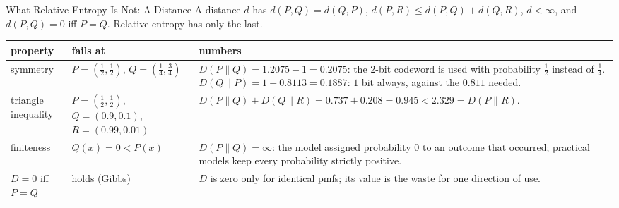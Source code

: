 \begin{frame}{What Relative Entropy Is Not: A Distance}
  \small
  A distance $d$ has $d(P,Q)=d(Q,P)$, $d(P,R)\le d(P,Q)+d(Q,R)$, $d<\infty$, and $d(P,Q)=0$ iff $P=Q$. Relative entropy has only the last.
  \begin{center}
    \renewcommand{\arraystretch}{1.2}
    \begin{tabular}{@{}>{\raggedright\arraybackslash}p{2.3cm}>{\raggedright\arraybackslash}p{4.2cm}>{\raggedright\arraybackslash}p{6.6cm}@{}}
      \toprule
      property & fails at & numbers \\
      \midrule
      symmetry & $P=(\tfrac12,\tfrac12)$, $Q=(\tfrac14,\tfrac34)$ &
        $D(P\|Q)=1.2075-1=0.2075$: the $2$-bit codeword is used with probability $\tfrac12$ instead of $\tfrac14$. \newline
        $D(Q\|P)=1-0.8113=0.1887$: $1$ bit always, against the $0.811$ needed. \\
      triangle inequality & $P=(\tfrac12,\tfrac12)$, $Q=(0.9,0.1)$, $R=(0.99,0.01)$ &
        $D(P\|Q)+D(Q\|R)=0.737+0.208=0.945<2.329=D(P\|R)$. \\
      finiteness & $Q(x)=0<P(x)$ &
        $D(P\|Q)=\infty$: the model assigned probability $0$ to an outcome that occurred; practical models keep every probability strictly positive. \\
      $D=0$ iff $P=Q$ & holds (Gibbs) &
        $D$ is zero only for identical pmfs; its value is the waste for one direction of use. \\
      \bottomrule
    \end{tabular}
  \end{center}
\end{frame}

